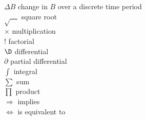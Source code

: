 \begin{tabbing}
$\varDelta B$ \> change in $B$ over a discrete time period\\
$\sqrt{\quad}$ \> square root\\
$\times$ \> multiplication\\
$!$ \> factorial\\
$\D$ \> differential\\
$\partial$ \> partial differential \\
$\int$ \> integral\\
$\sum$ \> sum\\
$\prod$ \> product\\
$\Longrightarrow$ \> implies\\
$\Longleftrightarrow$ \> is equivalent to\\
\end{tabbing}
